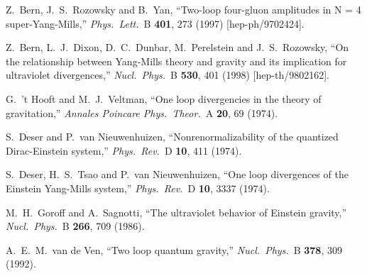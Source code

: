 \documentclass[12pt]{livrev}
\begin{document}
\begin{thebibliography}{99}
Z.~Bern, J.~S.~Rozowsky and B.~Yan,
``Two-loop four-gluon amplitudes in N = 4 super-Yang-Mills,''
{\it Phys.\ Lett.}\ B {\bf 401}, 273 (1997)
[hep-ph/9702424].

Z.~Bern, L.~J.~Dixon, D.~C.~Dunbar, M.~Perelstein and J.~S.~Rozowsky,
``On the relationship between Yang-Mills theory and gravity and its
  implication for ultraviolet divergences,''
{\it Nucl.\ Phys.}\ B {\bf 530}, 401 (1998)
[hep-th/9802162].

G.~'t Hooft and M.~J.~Veltman,
``One loop divergencies in the theory of gravitation,''
{\it Annales Poincare Phys.\ Theor.}\ A {\bf 20}, 69 (1974).

S.~Deser and P.~van Nieuwenhuizen,
``Nonrenormalizability of the quantized Dirac-Einstein system,''
{\it Phys.\ Rev.}\ D {\bf 10}, 411 (1974).

S.~Deser, H.~S.~Tsao and P.~van Nieuwenhuizen,
``One loop divergences of the Einstein Yang-Mills system,''
{\it Phys.\ Rev.}\ D {\bf 10}, 3337 (1974).

M.~H.~Goroff and A.~Sagnotti,
``The ultraviolet behavior of Einstein gravity,''
{\it Nucl.\ Phys.}\ B {\bf 266}, 709 (1986).

A.~E.~M.~van de Ven,
``Two loop quantum gravity,''
{\it Nucl.\ Phys.}\ B {\bf 378}, 309 (1992).


\end{thebibliography}
\end{document}
